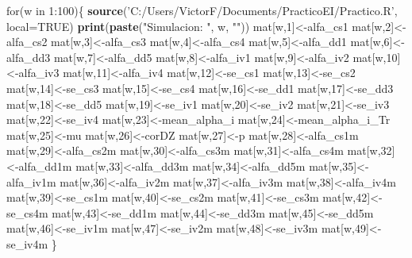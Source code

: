 \documentclass[]{article}
\newenvironment{Shaded}{\begin{snugshade}}{\end{snugshade}}
\newcommand{\KeywordTok}[1]{\textcolor[rgb]{0.13,0.29,0.53}{\textbf{{#1}}}}
\newcommand{\DataTypeTok}[1]{\textcolor[rgb]{0.13,0.29,0.53}{{#1}}}
\newcommand{\DecValTok}[1]{\textcolor[rgb]{0.00,0.00,0.81}{{#1}}}
\newcommand{\StringTok}[1]{\textcolor[rgb]{0.31,0.60,0.02}{{#1}}}
\newcommand{\OtherTok}[1]{\textcolor[rgb]{0.56,0.35,0.01}{{#1}}}
\newcommand{\NormalTok}[1]{{#1}}
\begin{document}
\begin{Shaded}
\begin{Highlighting}[]
\NormalTok{for(w in }\DecValTok{1}\NormalTok{:}\DecValTok{100}\NormalTok{)\{}
  \KeywordTok{source}\NormalTok{(}\StringTok{'C:/Users/VictorF/Documents/PracticoEI/Practico.R'}\NormalTok{, }\DataTypeTok{local=}\OtherTok{TRUE}\NormalTok{)}
  \KeywordTok{print}\NormalTok{(}\KeywordTok{paste}\NormalTok{(}\StringTok{"Simulacion: "}\NormalTok{, w, }\StringTok{""}\NormalTok{))}
  \NormalTok{mat[w,}\DecValTok{1}\NormalTok{]<-alfa_cs1}
  \NormalTok{mat[w,}\DecValTok{2}\NormalTok{]<-alfa_cs2}
  \NormalTok{mat[w,}\DecValTok{3}\NormalTok{]<-alfa_cs3}
  \NormalTok{mat[w,}\DecValTok{4}\NormalTok{]<-alfa_cs4}
  \NormalTok{mat[w,}\DecValTok{5}\NormalTok{]<-alfa_dd1}
  \NormalTok{mat[w,}\DecValTok{6}\NormalTok{]<-alfa_dd3}
  \NormalTok{mat[w,}\DecValTok{7}\NormalTok{]<-alfa_dd5}
  \NormalTok{mat[w,}\DecValTok{8}\NormalTok{]<-alfa_iv1}
  \NormalTok{mat[w,}\DecValTok{9}\NormalTok{]<-alfa_iv2}
  \NormalTok{mat[w,}\DecValTok{10}\NormalTok{]<-alfa_iv3}
  \NormalTok{mat[w,}\DecValTok{11}\NormalTok{]<-alfa_iv4}
  \NormalTok{mat[w,}\DecValTok{12}\NormalTok{]<-se_cs1}
  \NormalTok{mat[w,}\DecValTok{13}\NormalTok{]<-se_cs2}
  \NormalTok{mat[w,}\DecValTok{14}\NormalTok{]<-se_cs3}
  \NormalTok{mat[w,}\DecValTok{15}\NormalTok{]<-se_cs4}
  \NormalTok{mat[w,}\DecValTok{16}\NormalTok{]<-se_dd1}
  \NormalTok{mat[w,}\DecValTok{17}\NormalTok{]<-se_dd3}
  \NormalTok{mat[w,}\DecValTok{18}\NormalTok{]<-se_dd5}
  \NormalTok{mat[w,}\DecValTok{19}\NormalTok{]<-se_iv1}
  \NormalTok{mat[w,}\DecValTok{20}\NormalTok{]<-se_iv2}
  \NormalTok{mat[w,}\DecValTok{21}\NormalTok{]<-se_iv3}
  \NormalTok{mat[w,}\DecValTok{22}\NormalTok{]<-se_iv4}
  \NormalTok{mat[w,}\DecValTok{23}\NormalTok{]<-mean_alpha_i}
  \NormalTok{mat[w,}\DecValTok{24}\NormalTok{]<-mean_alpha_i_Tr}
  \NormalTok{mat[w,}\DecValTok{25}\NormalTok{]<-mu}
  \NormalTok{mat[w,}\DecValTok{26}\NormalTok{]<-corDZ}
  \NormalTok{mat[w,}\DecValTok{27}\NormalTok{]<-p}
  \NormalTok{mat[w,}\DecValTok{28}\NormalTok{]<-alfa_cs1m}
  \NormalTok{mat[w,}\DecValTok{29}\NormalTok{]<-alfa_cs2m}
  \NormalTok{mat[w,}\DecValTok{30}\NormalTok{]<-alfa_cs3m}
  \NormalTok{mat[w,}\DecValTok{31}\NormalTok{]<-alfa_cs4m}
  \NormalTok{mat[w,}\DecValTok{32}\NormalTok{]<-alfa_dd1m}
  \NormalTok{mat[w,}\DecValTok{33}\NormalTok{]<-alfa_dd3m}
  \NormalTok{mat[w,}\DecValTok{34}\NormalTok{]<-alfa_dd5m}
  \NormalTok{mat[w,}\DecValTok{35}\NormalTok{]<-alfa_iv1m}
  \NormalTok{mat[w,}\DecValTok{36}\NormalTok{]<-alfa_iv2m}
  \NormalTok{mat[w,}\DecValTok{37}\NormalTok{]<-alfa_iv3m}
  \NormalTok{mat[w,}\DecValTok{38}\NormalTok{]<-alfa_iv4m}
  \NormalTok{mat[w,}\DecValTok{39}\NormalTok{]<-se_cs1m}
  \NormalTok{mat[w,}\DecValTok{40}\NormalTok{]<-se_cs2m}
  \NormalTok{mat[w,}\DecValTok{41}\NormalTok{]<-se_cs3m}
  \NormalTok{mat[w,}\DecValTok{42}\NormalTok{]<-se_cs4m}
  \NormalTok{mat[w,}\DecValTok{43}\NormalTok{]<-se_dd1m}
  \NormalTok{mat[w,}\DecValTok{44}\NormalTok{]<-se_dd3m}
  \NormalTok{mat[w,}\DecValTok{45}\NormalTok{]<-se_dd5m}
  \NormalTok{mat[w,}\DecValTok{46}\NormalTok{]<-se_iv1m}
  \NormalTok{mat[w,}\DecValTok{47}\NormalTok{]<-se_iv2m}
  \NormalTok{mat[w,}\DecValTok{48}\NormalTok{]<-se_iv3m}
  \NormalTok{mat[w,}\DecValTok{49}\NormalTok{]<-se_iv4m}
\NormalTok{\}}
\end{Highlighting}
\end{Shaded}
\end{document}
